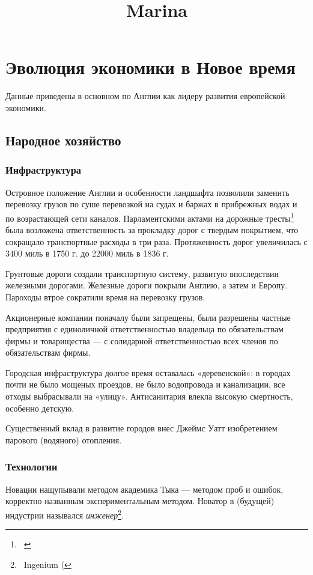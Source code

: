 \documentclass[a4paper]{article}
\title{Marina}
\begin{document}
\clearpage\setcounter{page}{1}\pagestyle{Standard}
\section[1.2 Эволюция экономики в Новое время]{ Эволюция экономики в Новое время}
{
Данные приведены в основном по Англии как лидеру развития европейской экономики.}

\subsection[Народное хозяйство]{\rmfamily Народное хозяйство}
\subsubsection[Инфраструктура]{\rmfamily\bfseries Инфраструктура}
{
Островное положение Англии и особенности ландшафта позволили заменить перевозку грузов по суше перевозкой на судах и
баржах в прибрежных водах и по возрастающей сети каналов. Парламентскими актами на дорожные
тресты\footnote{\ } была возложена ответственность за прокладку дорог с твердым
покрытием, что сокращало транспортные расходы в три раза. Протяженность дорог увеличилась с 3400 миль в 1750 г. до
22000 миль в 1836 г.}

{
Грунтовые дороги создали транспортную систему, развитую впоследствии железными дорогами. Железные дороги покрыли Англию,
а затем и Европу. Пароходы втрое сократили время на перевозку грузов.}

{
Акционерные компании поначалу были запрещены, были разрешены частные предприятия с единоличной ответственностью
владельца по обязательствам фирмы и товарищества — с солидарной ответственностью всех членов по обязательствам фирмы.}

{
Городская инфраструктура долгое время оставалась «деревенской»: в городах почти не было мощеных проездов, не было
водопровода и канализации, все отходы выбрасывали на «улицу». Антисанитария влекла высокую смертность, особенно
детскую.}

{
Существенный вклад в развитие городов внес Джеймс Уатт изобретением парового (водяного) отопления.}

\subsubsection[Технологии ]{\rmfamily\bfseries Технологии }
{
Новации нащупывали методом академика Тыка — методом проб и ошибок, корректно названным экспериментальным методом.
Новатор в (будущей) индустрии назывался \textit{инженер}\footnote{\ \foreignlanguage{english}{Ingenium}
(}. }
\end{document}

